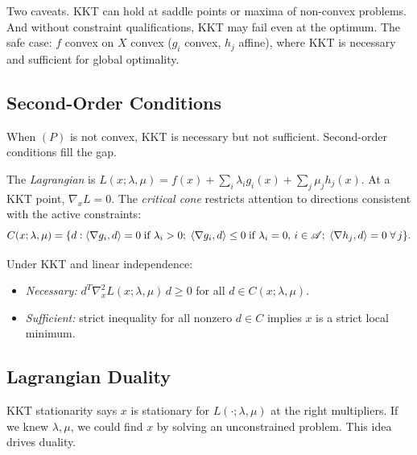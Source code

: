 Two caveats.
KKT can hold at saddle points or maxima of non-convex problems.
And without constraint qualifications, KKT may fail even at the optimum.
The safe case: $f$ convex on $X$ convex ($g_i$ convex, $h_j$ affine), where KKT is necessary and sufficient for global optimality.


\subsection{Second-Order Conditions}\label{sec:sosc}

When $(P)$ is not convex, KKT is necessary but not sufficient.
Second-order conditions fill the gap.

\begin{definition}\label{def:lagrangian}
	The \emph{Lagrangian} is $L(x; \lambda, \mu) = f(x) + \sum_i \lambda_i g_i(x) + \sum_j \mu_j h_j(x)$.
	At a KKT point, $\nabla_x L = 0$.
	The \emph{critical cone} restricts attention to directions consistent with the active constraints:
	\begin{equation}\label{eq:critical-cone}
		C(x; \lambda, \mu) = \{d : \langle\nabla g_i, d\rangle = 0\;\text{if } \lambda_i > 0;\;
		\langle\nabla g_i, d\rangle \leq 0\;\text{if } \lambda_i = 0,\, i \in \mathcal{A};\;
		\langle\nabla h_j, d\rangle = 0\;\forall\, j\}.
	\end{equation}
\end{definition}

\begin{theorem}\label{thm:sosc}
	Under KKT and linear independence:
	\begin{itemize}
		\item \textit{Necessary:} $d^T \nabla^2_x L(x; \lambda, \mu)\, d \geq 0$ for all $d \in C(x; \lambda, \mu)$.
		\item \textit{Sufficient:} strict inequality for all nonzero $d \in C$ implies $x$ is a strict local minimum.
	\end{itemize}
\end{theorem}


\subsection{Lagrangian Duality}\label{sec:duality}

KKT stationarity says $x$ is stationary for $L(\cdot; \lambda, \mu)$ at the right multipliers.
If we knew $\lambda, \mu$, we could find $x$ by solving an unconstrained problem.
This idea drives duality.

